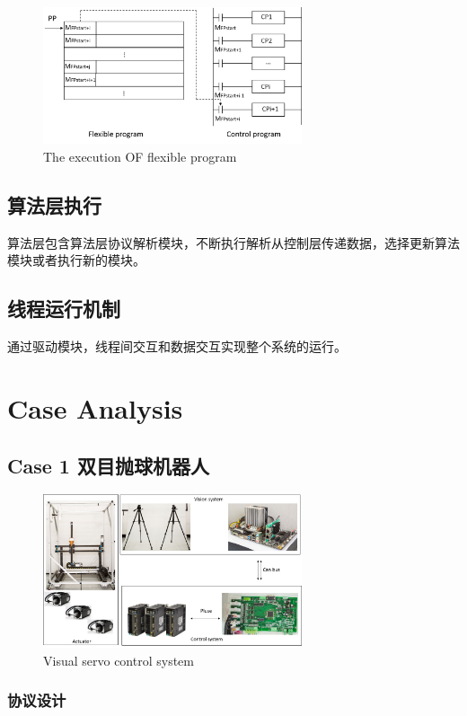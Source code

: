 \documentclass[journal,UTF8]{IEEEtran}
\begin{document}
\begin{figure}
	\centering
	\includegraphics[width=3in]{fig/execution.png}
	\caption{ The execution OF flexible program}
	\label{fig:execution}
\end{figure}

\subsection{算法层执行}
算法层包含算法层协议解析模块，不断执行解析从控制层传递数据，选择更新算法模块或者执行新的模块。
\subsection{线程运行机制}
通过驱动模块，线程间交互和数据交互实现整个系统的运行。


\section{Case Analysis}
\label{Case}
\subsection{Case 1 双目抛球机器人}
\begin{figure}
	\centering
	\includegraphics[width=3in]{fig/visual_control_system.png}
	\caption{ Visual servo control system}
	\label{fig:VIsualServoControlSystem}
\end{figure}
\subsubsection{协议设计}
\end{document}
